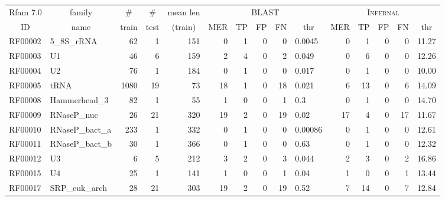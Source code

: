 

\renewcommand{\baselinestretch}{1.0}
\begin{table}
\scriptsize
\begin{center}
\begin{tabular}{|ll|rrr|rrrrl|rrrrr|} \hline
\multicolumn{1}{|c}{Rfam 7.0} & \multicolumn{1}{c|}{family} & \multicolumn{1}{c}{\#} & \multicolumn{1}{c}{\#} & \multicolumn{1}{c}{mean len} & \multicolumn{5}{|c|}{\textsc{BLAST}} & \multicolumn{5}{|c|}{\textsc{Infernal}} \\ 
\multicolumn{1}{|c}{ID} & \multicolumn{1}{c|}{name} & \multicolumn{1}{c}{train} & \multicolumn{1}{c}{test} & \multicolumn{1}{c|}{(train)} & \multicolumn{1}{c}{MER} & \multicolumn{1}{c}{TP} & \multicolumn{1}{c}{FP} & \multicolumn{1}{c}{FN} & \multicolumn{1}{c|}{thr} & \multicolumn{1}{c}{MER} & \multicolumn{1}{c}{TP} & \multicolumn{1}{c}{FP} & \multicolumn{1}{c}{FN} & \multicolumn{1}{c|}{thr} \\ \hline 
RF00002 & 5\_8S\_rRNA & 62 & 1 & 151 & 0 & 1 & 0 & 0 & 0.0045 & 0 & 1 & 0 & 0 &  11.27 \\  
RF00003 & U1 & 46 & 6 & 159 & 2 & 4 & 0 & 2 &  0.049 & 0 & 6 & 0 & 0 &  12.26 \\  
RF00004 & U2 & 76 & 1 & 184 & 0 & 1 & 0 & 0 &  0.017 & 0 & 1 & 0 & 0 &     10.00 \\  
RF00005 & tRNA & 1080 & 19 & 73 & 18 & 1 & 0 & 18 &  0.021 & 6 & 13 & 0 & 6 &  14.09 \\  
RF00008 & Hammerhead\_3 & 82 & 1 & 55 & 1 & 0 & 0 & 1 &    0.3 & 0 & 1 & 0 & 0 &   14.70 \\  
RF00009 & RNaseP\_nuc & 26 & 21 & 320 & 19 & 2 & 0 & 19 &   0.02 & 17 & 4 & 0 & 17 &  11.67 \\  
RF00010 & RNaseP\_bact\_a & 233 & 1 & 332 & 0 & 1 & 0 & 0 & 0.00086 & 0 & 1 & 0 & 0 &  12.61 \\  
RF00011 & RNaseP\_bact\_b & 30 & 1 & 366 & 0 & 1 & 0 & 0 &   0.63 & 0 & 1 & 0 & 0 &  12.32 \\  
RF00012 & U3 & 6 & 5 & 212 & 3 & 2 & 0 & 3 &  0.044 & 2 & 3 & 0 & 2 &  16.86 \\  
RF00015 & U4 & 25 & 1 & 141 & 1 & 0 & 0 & 1 &   0.04 & 1 & 0 & 0 & 1 &  13.44 \\  
RF00017 & SRP\_euk\_arch & 28 & 21 & 303 & 19 & 2 & 0 & 19 &   0.52 & 7 & 14 & 0 & 7 &  12.84 \\  

\end{tabular}
\end{center}
\end{table}
